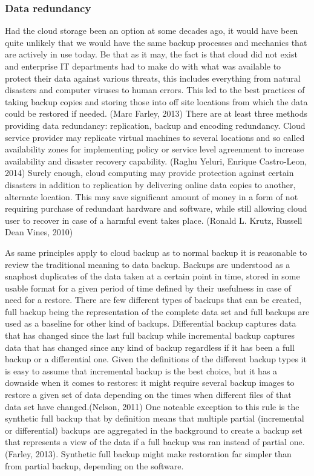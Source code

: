 \documentclass{article}
\begin{document}
\subsubsection{Data redundancy}
Had the cloud storage been an option at some decades ago, it would have been quite unlikely that we would have the same backup processes and mechanics that are actively in use today. Be that as it may, the fact is that cloud did not exist and enterprise IT departments had to make do with what was available to protect their data against various threats, this includes everything from natural disasters and computer viruses to human errors. This led to the best practices of taking backup copies and storing those into off site locations from which the data could be restored if needed. (Marc Farley, 2013) 
There are at least three methods providing data redundancy: replication, backup and encoding redundancy. Cloud service provider may replicate virtual machines to several locations and so called availability zones for implementing policy or service level agreenment to increase availability and disaster recovery capability. (Raghu Yeluri, Enrique Castro-Leon, 2014) Surely enough, cloud computing may provide protection against certain disasters in addition to replication by delivering online data copies to another, alternate location. This may save significant amount of money in a form of not requiring purchase of redundant hardware and software, while still allowing cloud user to recover in case of a harmful event takes place. (Ronald L. Krutz, Russell Dean Vines, 2010)
\par
As same principles apply to cloud backup as to normal backup it is reasonable to review the traditional meaning to data backup. Backups are understood as a snaphost duplicates of the data taken at a certain point in time, stored in some usable format for a given period of time defined by their usefulness in case of need for a restore. There are few different types of backups that can be created, full backup being the representation of the complete data set and full backups are used as a baseline for other kind of backups. Differential backup captures data that has changed since the last full backup while incremental backup captures data that has changed since any kind of backup regardless if it has been a full backup or a differential one. Given the definitions of the different backup types it is easy to assume that incremental backup is the best choice, but it has a downside when it comes to restores: it might require several backup images to restore a given set of data depending on the times when different files of that data set have changed.(Nelson, 2011) One noteable exception to this rule is the synthetic full backup that by definition means that multiple partial (incremental or differential) backups are aggregated in the background to create a backup set that represents a view of the data if a full backup was ran instead of partial one.(Farley, 2013). Synthetic full backup might make restoration far simpler than from partial backup, depending on the software.
\end{document}
